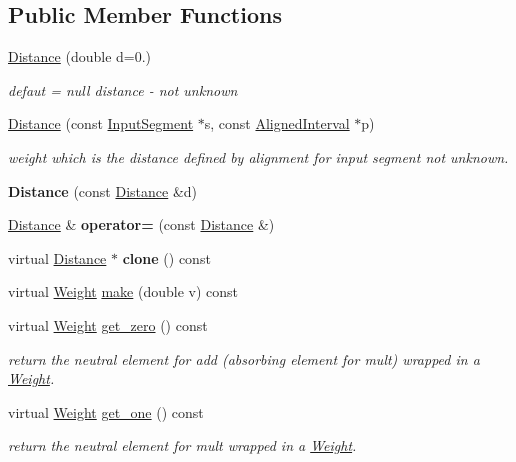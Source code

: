 \subsection*{Public Member Functions}
\begin{DoxyCompactItemize}
\item 
\mbox{\label{classDistance_af0d871cc82151e600c043de0765bcb9d}} 
\mbox{\hyperlink{classDistance_af0d871cc82151e600c043de0765bcb9d}{Distance}} (double d=0.)
\begin{DoxyCompactList}\small\item\em defaut = null distance -\/ not unknown \end{DoxyCompactList}\item 
\mbox{\hyperlink{group__weight_ga4ebd2ecbdf6955d1ed9064d391cc71b7}{Distance}} (const \mbox{\hyperlink{classInputSegment}{Input\+Segment}} $\ast$s, const \mbox{\hyperlink{classAlignedInterval}{Aligned\+Interval}} $\ast$p)
\begin{DoxyCompactList}\small\item\em weight which is the distance defined by alignment for input segment not unknown. \end{DoxyCompactList}\item 
\mbox{\label{classDistance_ae27d1f8eca9cda4e4435c933e94daa53}} 
{\bfseries Distance} (const \mbox{\hyperlink{classDistance}{Distance}} \&d)
\item 
\mbox{\hyperlink{classDistance}{Distance}} \& {\bfseries operator=} (const \mbox{\hyperlink{classDistance}{Distance}} \&)
\item 
virtual \mbox{\hyperlink{classDistance}{Distance}} $\ast$ {\bfseries clone} () const
\item 
virtual \mbox{\hyperlink{classWeight}{Weight}} \mbox{\hyperlink{classDistance_a1fe45f762afff378c46f81d6199a14ab}{make}} (double v) const
\item 
\mbox{\label{classDistance_affe4a5bab7ca33e5119d3f93484dccb3}} 
virtual \mbox{\hyperlink{classWeight}{Weight}} \mbox{\hyperlink{classDistance_affe4a5bab7ca33e5119d3f93484dccb3}{get\+\_\+zero}} () const
\begin{DoxyCompactList}\small\item\em return the neutral element for add (absorbing element for mult) wrapped in a \mbox{\hyperlink{classWeight}{Weight}}. \end{DoxyCompactList}\item 
\mbox{\label{classDistance_a8aac0a94a73b60ef2bf566eb59a3e704}} 
virtual \mbox{\hyperlink{classWeight}{Weight}} \mbox{\hyperlink{classDistance_a8aac0a94a73b60ef2bf566eb59a3e704}{get\+\_\+one}} () const
\begin{DoxyCompactList}\small\item\em return the neutral element for mult wrapped in a \mbox{\hyperlink{classWeight}{Weight}}. \end{DoxyCompactList}\end{DoxyCompactItemize}
